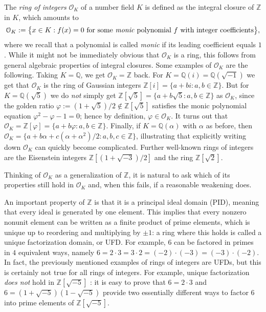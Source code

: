 \documentclass[a4paper,USenglish,cleveref, autoref, thm-restate]{lipics-v2021}
\newcommand*{\OK}[1][K]{\mathcal{O}_{#1}}
\newcommand{\Q}{\mathbb{Q}}
\newcommand{\Z}{\mathbb{Z}}
\begin{document}
The \emph{ring of integers} $\OK$ of a number field $K$ is defined as the integral closure of $\Z$ in $K$, which amounts to
\[
  \OK := \big\{x \in K : f(x)=0 \text{ for some \emph{monic} polynomial } f \text{ with integer coefficients}\big\},\]
where we recall that a polynomial is called \emph{monic} if its leading coefficient equals $1$.
While it might not be immediately obvious that $\OK$ is a ring, this follows from general algebraic properties of integral closures.
Some examples of $\OK$ are the following. Taking $K=\Q$, we get $\OK=\Z$ back.
For $K=\Q(i)=\Q(\sqrt{-1})$ we get that $\OK$ is the ring of Gaussian integers $\Z[i]=\{a+bi : a,b \in \Z\}$.
But for $K=\Q(\sqrt{5})$ we do \emph{not} simply get $\Z[\sqrt{5}]=\{a+b\sqrt{5} : a,b \in \Z\}$ as $\OK$, since the golden ratio $\varphi:=(1+\sqrt{5})/2\not\in \Z[\sqrt{5}]$ satisfies the monic polynomial equation $\varphi^2-\varphi-1=0$; hence by definition, $\varphi \in \OK$.
It turns out that $\OK=\Z[\varphi]=\{a+b\varphi : a,b \in \Z\}$.
Finally, if $K=\Q(\alpha)$ with $\alpha$ as before, then $\OK=\{a+b \alpha+c (\alpha+\alpha^2)/2 : a,b,c \in \Z\}$, illustrating that explicitly writing down $\OK$ can quickly become complicated.
Further well-known rings of integers are %
the Eisenstein integers $\Z[(1+\sqrt{-3})/2]$ and the ring $\Z[\sqrt{2}]$.

Thinking of $\OK$ as a generalization of $\Z$, it is natural to ask which of its properties %
still hold in $\OK$ and, when this fails, if a reasonable weakening does. %

An important property of $\Z$ is that it is a principal ideal domain (PID), meaning that every ideal is generated by one element. This implies that every nonzero nonunit element can be written as a %
finite product of prime elements, which is unique up to reordering and multiplying by $\pm 1$: a ring where this holds is called a unique factorization domain, or UFD. %
For example, $6$ can be factored in primes in $4$ equivalent ways, namely $6=2\cdot 3=3\cdot2=(-2)\cdot (-3)=(-3) \cdot (-2)$.
In fact, the previously mentioned examples of rings of integers are UFDs, but this is certainly not true for all rings of integers. For example, unique factorization \emph{does not} hold in $\Z[\sqrt{-5}]$%
: it is easy to prove that $6=2\cdot3$ and $6=(1+\sqrt{-5}) (1-\sqrt{-5})$ provide two essentially different ways to factor $6$ into prime elements of $\Z[\sqrt{-5}]$.
\end{document}
